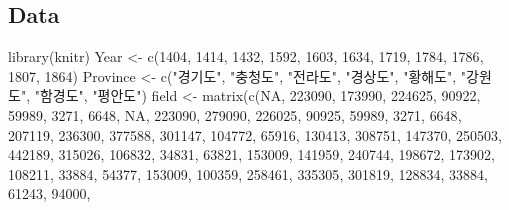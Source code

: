 \documentclass[
]{article}
\newenvironment{Shaded}{\begin{snugshade}}{\end{snugshade}}
\newcommand{\ConstantTok}[1]{\textcolor[rgb]{0.00,0.00,0.00}{#1}}
\newcommand{\DecValTok}[1]{\textcolor[rgb]{0.00,0.00,0.81}{#1}}
\newcommand{\FunctionTok}[1]{\textcolor[rgb]{0.00,0.00,0.00}{#1}}
\newcommand{\NormalTok}[1]{#1}
\newcommand{\OtherTok}[1]{\textcolor[rgb]{0.56,0.35,0.01}{#1}}
\newcommand{\StringTok}[1]{\textcolor[rgb]{0.31,0.60,0.02}{#1}}
\begin{document}
\hypertarget{data}{%
\subsection{Data}\label{data}}

\begin{Shaded}
\begin{Highlighting}[]
\FunctionTok{library}\NormalTok{(knitr)}
\NormalTok{Year }\OtherTok{\textless{}{-}} \FunctionTok{c}\NormalTok{(}\DecValTok{1404}\NormalTok{, }\DecValTok{1414}\NormalTok{, }\DecValTok{1432}\NormalTok{, }\DecValTok{1592}\NormalTok{, }\DecValTok{1603}\NormalTok{, }\DecValTok{1634}\NormalTok{, }\DecValTok{1719}\NormalTok{, }\DecValTok{1784}\NormalTok{, }\DecValTok{1786}\NormalTok{, }\DecValTok{1807}\NormalTok{, }\DecValTok{1864}\NormalTok{)}
\NormalTok{Province }\OtherTok{\textless{}{-}} \FunctionTok{c}\NormalTok{(}\StringTok{"경기도"}\NormalTok{, }\StringTok{"충청도"}\NormalTok{, }\StringTok{"전라도"}\NormalTok{, }\StringTok{"경상도"}\NormalTok{, }\StringTok{"황해도"}\NormalTok{, }\StringTok{"강원도"}\NormalTok{, }\StringTok{"함경도"}\NormalTok{, }\StringTok{"평안도"}\NormalTok{)}
\NormalTok{field }\OtherTok{\textless{}{-}} \FunctionTok{matrix}\NormalTok{(}\FunctionTok{c}\NormalTok{(}\ConstantTok{NA}\NormalTok{, }\DecValTok{223090}\NormalTok{, }\DecValTok{173990}\NormalTok{, }\DecValTok{224625}\NormalTok{, }\DecValTok{90922}\NormalTok{, }\DecValTok{59989}\NormalTok{, }\DecValTok{3271}\NormalTok{, }\DecValTok{6648}\NormalTok{,}
                  \ConstantTok{NA}\NormalTok{, }\DecValTok{223090}\NormalTok{, }\DecValTok{279090}\NormalTok{, }\DecValTok{226025}\NormalTok{, }\DecValTok{90925}\NormalTok{, }\DecValTok{59989}\NormalTok{, }\DecValTok{3271}\NormalTok{, }\DecValTok{6648}\NormalTok{,}
                  \DecValTok{207119}\NormalTok{, }\DecValTok{236300}\NormalTok{, }\DecValTok{377588}\NormalTok{, }\DecValTok{301147}\NormalTok{, }\DecValTok{104772}\NormalTok{, }\DecValTok{65916}\NormalTok{, }\DecValTok{130413}\NormalTok{, }\DecValTok{308751}\NormalTok{, }
                  \DecValTok{147370}\NormalTok{, }\DecValTok{250503}\NormalTok{, }\DecValTok{442189}\NormalTok{, }\DecValTok{315026}\NormalTok{, }\DecValTok{106832}\NormalTok{, }\DecValTok{34831}\NormalTok{, }\DecValTok{63821}\NormalTok{, }\DecValTok{153009}\NormalTok{,}
                  \DecValTok{141959}\NormalTok{, }\DecValTok{240744}\NormalTok{, }\DecValTok{198672}\NormalTok{, }\DecValTok{173902}\NormalTok{, }\DecValTok{108211}\NormalTok{, }\DecValTok{33884}\NormalTok{, }\DecValTok{54377}\NormalTok{, }\DecValTok{153009}\NormalTok{,}
                  \DecValTok{100359}\NormalTok{, }\DecValTok{258461}\NormalTok{, }\DecValTok{335305}\NormalTok{, }\DecValTok{301819}\NormalTok{, }\DecValTok{128834}\NormalTok{, }\DecValTok{33884}\NormalTok{, }\DecValTok{61243}\NormalTok{, }\DecValTok{94000}\NormalTok{,}

\end{Highlighting}
\end{Shaded}
\end{document}
